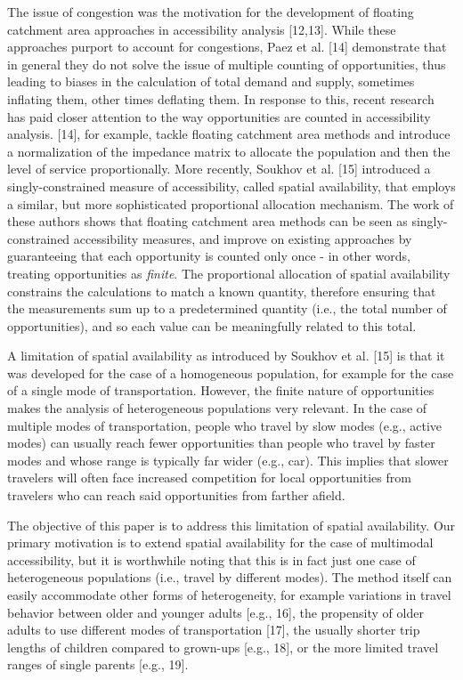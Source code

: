 \documentclass[10pt,letterpaper]{article}
\begin{document}
The issue of congestion was the motivation for the development of
floating catchment area approaches in accessibility analysis
{[}12,13{]}. While these approaches purport to account for congestions,
Paez et al. {[}14{]} demonstrate that in general they do not solve the
issue of multiple counting of opportunities, thus leading to biases in
the calculation of total demand and supply, sometimes inflating them,
other times deflating them. In response to this, recent research has
paid closer attention to the way opportunities are counted in
accessibility analysis. {[}14{]}, for example, tackle floating catchment
area methods and introduce a normalization of the impedance matrix to
allocate the population and then the level of service proportionally.
More recently, Soukhov et al. {[}15{]} introduced a singly-constrained
measure of accessibility, called spatial availability, that employs a
similar, but more sophisticated proportional allocation mechanism. The
work of these authors shows that floating catchment area methods can be
seen as singly-constrained accessibility measures, and improve on
existing approaches by guaranteeing that each opportunity is counted
only once - in other words, treating opportunities as \emph{finite}. The
proportional allocation of spatial availability constrains the
calculations to match a known quantity, therefore ensuring that the
measurements sum up to a predetermined quantity (i.e., the total number
of opportunities), and so each value can be meaningfully related to this
total.

A limitation of spatial availability as introduced by Soukhov et al.
{[}15{]} is that it was developed for the case of a homogeneous
population, for example for the case of a single mode of transportation.
However, the finite nature of opportunities makes the analysis of
heterogeneous populations very relevant. In the case of multiple modes
of transportation, people who travel by slow modes (e.g., active modes)
can usually reach fewer opportunities than people who travel by faster
modes and whose range is typically far wider (e.g., car). This implies
that slower travelers will often face increased competition for local
opportunities from travelers who can reach said opportunities from
farther afield.

The objective of this paper is to address this limitation of spatial
availability. Our primary motivation is to extend spatial availability
for the case of multimodal accessibility, but it is worthwhile noting
that this is in fact just one case of heterogeneous populations (i.e.,
travel by different modes). The method itself can easily accommodate
other forms of heterogeneity, for example variations in travel behavior
between older and younger adults {[}e.g., 16{]}, the propensity of older
adults to use different modes of transportation {[}17{]}, the usually
shorter trip lengths of children compared to grown-ups {[}e.g., 18{]},
or the more limited travel ranges of single parents {[}e.g., 19{]}.
\end{document}

